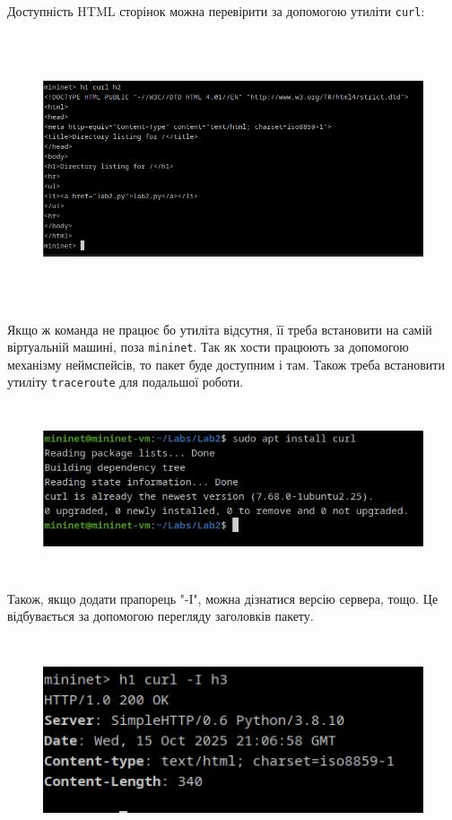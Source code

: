 \documentclass[14pt, a4paper]{extreport}
\begin{document}
	Доступність HTML сторінок можна перевірити за допомогою утиліти \texttt{curl}:
	
	\begin{figure}[H]
		\centering
		\includegraphics[height=8cm]{04} 
	\end{figure}
	
	Якщо ж команда не працює бо утиліта відсутня, її треба встановити на самій віртуальній машині, поза \texttt{mininet}. Так як хости працюють за допомогою механізму неймспейсів, то пакет буде доступним і там. Також треба встановити утиліту \texttt{traceroute} для подальшої роботи.
	
	\begin{figure}[H]
		\centering
		\includegraphics[height=5cm]{05} 
	\end{figure}
	
	Також, якщо додати прапорець "-І", можна дізнатися версію сервера, тощо. Це відбувається за допомогою перегляду заголовків пакету.
	
	\begin{figure}[H]
		\centering
		\includegraphics[height=6cm]{06} 
	\end{figure}
	
\end{document}
